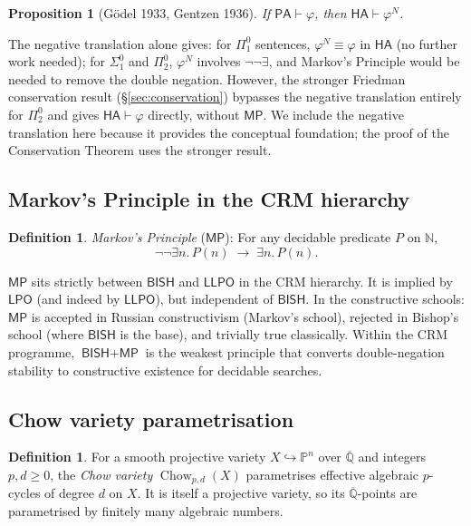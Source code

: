 \documentclass[11pt,a4paper]{article}
\theoremstyle{plain}
\newtheorem{proposition}[theorem]{Proposition}
\theoremstyle{definition}
\newtheorem{definition}[theorem]{Definition}
\newcommand{\BISH}{\textsf{BISH}}
\newcommand{\LLPO}{\textsf{LLPO}}
\newcommand{\LPO}{\textsf{LPO}}
\newcommand{\MP}{\textsf{MP}}
\newcommand{\HA}{\textsf{HA}}
\newcommand{\PA}{\textsf{PA}}
\newcommand{\Q}{\mathbb{Q}}
\newcommand{\N}{\mathbb{N}}
\DeclareMathOperator{\Chow}{Chow}
\begin{document}
\begin{proposition}[G\"odel 1933, Gentzen 1936]\label{prop:neg-trans}
If $\PA \vdash \varphi$, then $\HA \vdash \varphi^N$.
\end{proposition}

The negative translation alone gives: for $\Pi^0_1$ sentences, $\varphi^N \equiv \varphi$ in $\HA$ (no further work needed); for $\Sigma^0_1$ and $\Pi^0_2$, $\varphi^N$ involves $\lnot\lnot\exists$, and Markov's Principle would be needed to remove the double negation.  However, the stronger Friedman conservation result (\S\ref{sec:conservation}) bypasses the negative translation entirely for $\Pi^0_2$ and gives $\HA \vdash \varphi$ directly, without $\MP$.  We include the negative translation here because it provides the conceptual foundation; the proof of the Conservation Theorem uses the stronger result.

\subsection{Markov's Principle in the CRM hierarchy}

\begin{definition}\label{def:mp}
\emph{Markov's Principle} ($\MP$): For any decidable predicate $P$ on $\N$,
\[
\lnot\lnot\exists n.\, P(n) \;\longrightarrow\; \exists n.\, P(n).
\]
\end{definition}

$\MP$ sits strictly between $\BISH$ and $\LLPO$ in the CRM hierarchy.  It is implied by $\LPO$ (and indeed by $\LLPO$), but independent of $\BISH$.  In the constructive schools: $\MP$ is accepted in Russian constructivism (Markov's school), rejected in Bishop's school (where $\BISH$ is the base), and trivially true classically.  Within the CRM programme, $\BISH + \MP$ is the weakest principle that converts double-negation stability to constructive existence for decidable searches.

\subsection{Chow variety parametrisation}

\begin{definition}\label{def:chow}
For a smooth projective variety $X \hookrightarrow \mathbb{P}^n$ over $\overline{\Q}$ and integers $p, d \ge 0$, the \emph{Chow variety} $\Chow_{p,d}(X)$ parametrises effective algebraic $p$-cycles of degree $d$ on $X$.  It is itself a projective variety, so its $\overline{\Q}$-points are parametrised by finitely many algebraic numbers.
\end{definition}
\end{document}

